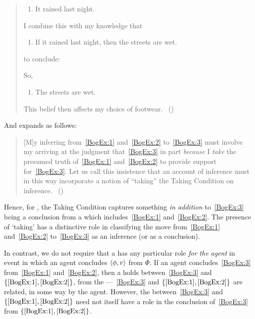 \begin{note}
\begin{quote}
    \begin{enumerate}[label=(\arabic*), ref=(\arabic*), series=BogEx]
    \item
      \label{BogEx:1}
      It rained last night.
    \end{enumerate}

    I combine this with my knowledge that

    \begin{enumerate}[label=(\arabic*), ref=(\arabic*), resume*=BogEx]
    \item
      \label{BogEx:2}
      If it rained last night, then the streets are wet.
    \end{enumerate}

    to conclude:

    So,

    \begin{enumerate}[label=(\arabic*), ref=(\arabic*), resume*=BogEx]
    \item
      \label{BogEx:3}
      The streets are wet.
    \end{enumerate}
    This belief then affects my choice of footwear.%
    \mbox{ }\hfill\mbox{(\citeyear[2]{Boghossian:2014aa})}
  \end{quote}

  And \citeauthor{Boghossian:2014aa} expands as follows:

  \begin{quote}
    [M]y inferring from~\ref{BogEx:1} and~\ref{BogEx:2} to~\ref{BogEx:3} must involve my arriving at the judgment that~\ref{BogEx:3} in part \emph{because} I \emph{take} the presumed truth of~\ref{BogEx:1} and~\ref{BogEx:2} to provide support for~\ref{BogEx:3}.
    Let us call this insistence that an account of inference must in this way incorporate a notion of ``taking'' the Taking Condition on inference.%
    \mbox{ }\hfill\mbox{(\citeyear[4]{Boghossian:2014aa})}
  \end{quote}

  Hence, for \citeauthor{Boghossian:2014aa}, the Taking Condition captures something \emph{in addition} to~\ref{BogEx:3} being a conclusion from a \poP{} which includes~\ref{BogEx:1} and~\ref{BogEx:2}.
  The presence of `taking' has a distinctive role in classifying the move from~\ref{BogEx:1} and~\ref{BogEx:2} to~\ref{BogEx:3} as an inference (or as a conclusion).

  In contrast, we do not require that a \ros{} has any particular role \emph{for the agent} in event in which an agent concludes \(\langle \phi, v \rangle\) from \(\Phi\).
  If an agent concludes~\ref{BogEx:3} from~\ref{BogEx:1} and~\ref{BogEx:2}, then a \ros{} holds between~\ref{BogEx:3} and \(\{\ref{BogEx:1}, \ref{BogEx:2}\}\), from the \agpe{} ---~\ref{BogEx:3} and \(\{\ref{BogEx:1}, \ref{BogEx:2}\}\) are related, in some way by the agent.
  However, the \ros{} between~\ref{BogEx:3} and \(\{\ref{BogEx:1}, \ref{BogEx:2}\}\) need not itself have a role in the \agents{} conclusion of~\ref{BogEx:3} from \(\{\ref{BogEx:1}, \ref{BogEx:2}\}\).
\end{note}

